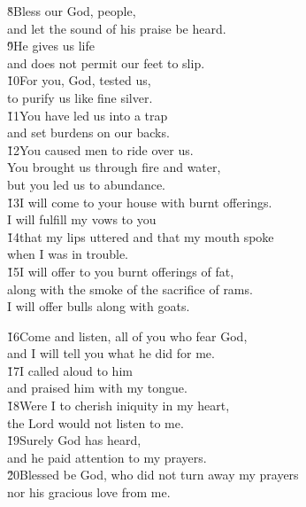 \begin{poetry}
\poeml \v{8}Bless our God, people, \\
\poemll    and let the sound of his praise be heard. \\
\poeml \v{9}He gives us life \\
\poemll    and does not permit our feet to slip. \\
\poeml \v{10}For you, God, tested us, \\
\poemll    to purify us like fine silver. \\
\poeml \v{11}You have led us into a trap \\
\poemll    and set burdens on our backs. \\
\poeml \v{12}You caused men to ride over us. \\
\poemll    You brought us through fire and water, \\
\poemlll       but you led us to abundance. \\
\poeml \v{13}I will come to your house with burnt offerings. \\
\poemll    I will fulfill my vows to you \\
\poeml \v{14}that my lips uttered and that my mouth spoke \\
\poemll    when I was in trouble. \\
\poeml \v{15}I will offer to you burnt offerings of fat, \\
\poemll    along with the smoke of the sacrifice of rams. \\
\poemlll       I will offer bulls along with goats.
\end{poetry}

\begin{poetry}
\poeml \v{16}Come and listen, all of you who fear God, \\
\poemll    and I will tell you what he did for me. \\
\poeml \v{17}I called aloud to him \\
\poemll    and praised him with my tongue. \\
\poeml \v{18}Were I to cherish iniquity in my heart, \\
\poemll    the Lord would not listen to me. \\
\poeml \v{19}Surely God has heard, \\
\poemll    and he paid attention to my prayers. \\
\poeml \v{20}Blessed be God, who did not turn away my prayers \\
\poemll    nor his gracious love from me.
\end{poetry}

